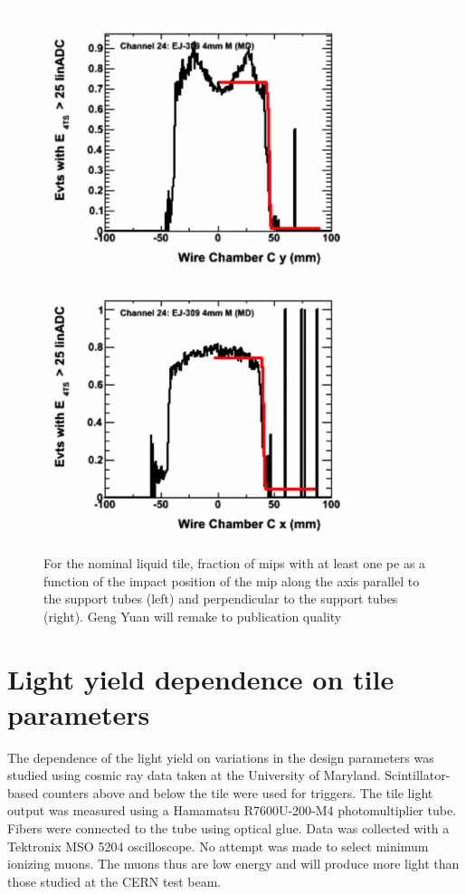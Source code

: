 \documentclass[review]{elsarticle}
\begin{document}
\begin{figure}[h]
\centering\includegraphics[scale=0.5]{./figures/fiducial3.png}
\centering\includegraphics[scale=0.5]{./figures/fiducial2.png}
\caption{For the nominal liquid tile, fraction of mips with at least
  one pe as a function of the impact position of the mip along the
  axis parallel to the support tubes (left) and perpendicular to the
  support tubes (right).{\color{red} Geng Yuan will remake to publication quality}}
\label{fig:fig1}
\end{figure}

\section{Light yield dependence on tile parameters}

The dependence of the light yield on variations in the design
parameters was studied using cosmic ray data taken at the University
of Maryland. Scintillator-based counters above and below the tile
were used for triggers. The tile light output was measured using a
Hamamatsu R7600U-200-M4 photomultiplier tube. Fibers were connected
to the tube using optical glue. Data was collected with a Tektronix
MSO 5204 oscilloscope. No attempt was made to select minimum ionizing
muons. The muons thus are low energy and will produce more light than
those studied at the CERN test beam.
\end{document}
